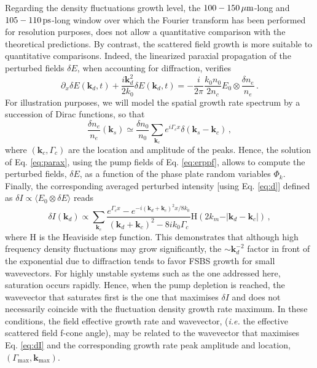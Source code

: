 \documentclass[
 reprint,
 superscriptaddress,
 amsmath,amssymb,
 aps,
]{revtex4-1}
\begin{document}
Regarding the density fluctuations  growth level, 
the $100-150\,\rm\mu m$-long  and $105-110\,\rm ps$-long window over which the Fourier transform has been performed for resolution purposes, does not allow a quantitative comparison with the theoretical predictions.
By contrast, the scattered field  growth is more suitable to quantitative comparisons. Indeed, the linearized paraxial propagation of the perturbed fields $\delta E$, when accounting for diffraction, verifies 
\begin{equation}
    \partial_x \delta E(\mathbf{k}_d,t) + \frac{i\mathbf{k}_d^2}{2k_0}\delta E(\mathbf{k}_d,t) = -\frac{i}{2\pi}\frac{k_0n_0}{2n_c}E_0\otimes \frac{\delta n_e}{n_e} \, . \label{eq:parax}
\end{equation}
For illustration purposes, we will model the spatial growth rate spectrum by a succession of Dirac functions, so that 
\begin{equation}
     \frac{\delta n_e}{n_e}(\mathbf{k}_s) \simeq  \frac{\delta n_0}{n_0} \sum_{\mathbf{k}_c} e^{i\Gamma_{c} x} \delta(\mathbf{k}_s-\mathbf{k}_c)\, , \label{eq:dnparax}
\end{equation}
where $(\mathbf{k}_c,\Gamma_{c})$ are the location and amplitude of the peaks. 
Hence,
the solution of Eq. \eqref{eq:parax}, using the pump fields of Eq. \eqref{eq:erppf},  allows to compute the perturbed fields, $\delta E$, as a function of the phase plate random variables $\Phi_k$. 
Finally, the corresponding averaged perturbed intensity [using Eq. \eqref{eq:d}] defined as 
$ \delta I \propto\langle  E_0 \otimes \delta E\rangle $ reads
\begin{equation}
\delta I (\mathbf{k}_d)\propto \sum_{\mathbf{k}_c} \frac{e^{\Gamma_c x} -e^{-i( \mathbf{k}_d +\mathbf{k}_c)^2x/8k_0} }{ ( \mathbf{k}_d +\mathbf{k}_c)^2 - 8ik_0\Gamma_c  } \mathrm{H}(2k_m - \vert  \mathbf{k}_d-\mathbf{k}_c \vert) \, , \label{eq:dI}
\end{equation}
where $\mathrm{H}$ is the Heaviside step function.
This demonstrates that although high frequency density fluctuations may grow significantly, the $\sim \mathbf{k}_d^{-2}$ factor in front of the exponential due to diffraction tends to favor FSBS growth for small wavevectors. 
For highly unstable systems such as the one addressed here, saturation occurs rapidly.
Hence, when the pump depletion is reached, the wavevector that saturates first is the one that maximises $\delta I$ and does not necessarily coincide with the fluctuation density growth rate maximum. 
In these conditions, the field effective growth rate and wavevector, (\emph{i.e.}
the effective scattered field f-cone angle), may be related to the wavevector that maximises Eq. \eqref{eq:dI} and the corresponding growth rate peak amplitude and location, $(\Gamma_\mathrm{max},\mathbf{k}_\mathrm{max})$.
\end{document}
